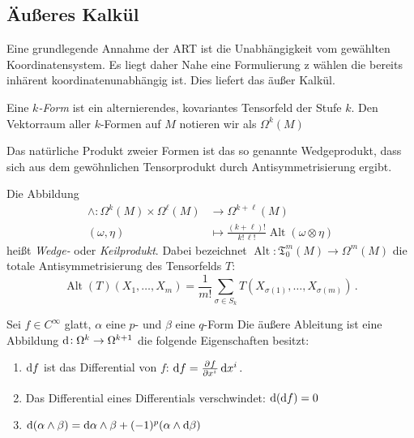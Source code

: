 \subsection{Äußeres Kalkül}
Eine grundlegende Annahme der ART ist die Unabhängigkeit vom gewählten
Koordinatensystem. Es liegt daher Nahe eine Formulierung z wählen die bereits
inhärent koordinatenunabhängig ist. Dies liefert das äußer Kalkül. 
\begin{definition}[Differentialformen]
Eine \emph{$k$-Form} ist ein alternierendes, kovariantes Tensorfeld der Stufe
$k$. Den Vektorraum aller $k$-Formen auf $M$ notieren wir als $\Omega^k(M)$
\end{definition}
Das natürliche Produkt zweier Formen ist das so genannte Wedgeprodukt, dass
sich aus dem gewöhnlichen Tensorprodukt durch Antisymmetrisierung ergibt.
\begin{definition}[Wedgeprodukt]
Die Abbildung
\begin{equation}
\begin{split}
\wedge:\Omega^k(M)\times \Omega^\ell(M)&\to \Omega^{k+\ell}(M)\\
(\omega,\eta)&\mapsto\frac{(k+\ell)!}{k!\,\ell!}\operatorname{Alt}(\omega\otimes\eta)
\end{split}
\end{equation}
heißt \emph{Wedge-} oder \emph{Keilprodukt}.
Dabei bezeichnet $\operatorname{Alt}:\mathfrak{T}^{m}_0(M)\to \Omega^m(M)$ die
totale Antisymmetrisierung des Tensorfelds $T$:
\begin{equation}
\operatorname{Alt}(T)\left(X_1,\dots,X_m\right)=\frac{1}{m!}\sum_{\sigma\in
S_k}T\left(X_{\sigma(1)},\dots,X_{\sigma(m)}\right)\,.
\end{equation}
\end{definition}
\begin{definition}
Sei $f\in C^\infty$ glatt, $\alpha$ eine $p$- und $\beta$ eine $q$-Form
Die äußere Ableitung ist eine Abbildung $\dif:\Omega^{k}\to \Omega^{k+1}$ die
folgende Eigenschaften besitzt:
\begin{enumerate}
  \item $\dif f$ ist das Differential von $f$: $\dif
  f=\pd{f}{\tensor{x}{^i}}\dif\tensor{x}{^i}\,.$
  \item Das Differential eines Differentials verschwindet: $\dif\,(\dif f)=0$
  \item $\dif\,(\alpha\wedge \beta)=\dif
  \alpha\wedge\beta+(-1)^p(\alpha\wedge\dif \beta)$
\end{enumerate}

\end{definition}
